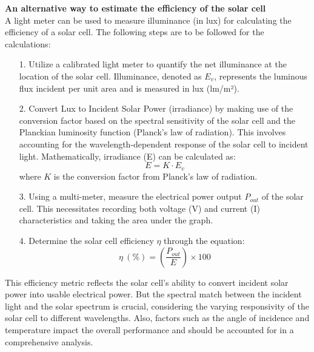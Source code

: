 \textbf{An alternative way to estimate the efficiency of the solar cell}\\ A light meter can be used to measure illuminance (in lux) for calculating the efficiency of a solar cell. The following steps are to be followed for the calculations: 
\begin{itemize} 
\item [1.] Utilize a calibrated light meter to quantify the net illuminance at the location of the solar cell. Illuminance, denoted as $E_v$, represents the luminous flux incident per unit area and is measured in lux (lm/m²).
\item [2.] Convert Lux to Incident Solar Power (irradiance) by making use of the conversion factor based on the spectral sensitivity of the solar cell and the Planckian luminosity function (Planck's law of radiation). This involves accounting for the wavelength-dependent response of the solar cell to incident light. Mathematically, irradiance (E) can be calculated as: 
\[E = K \cdot E_v\] where \(K\) is the conversion factor from Planck's law of radiation. 
\item [3.] Using a multi-meter, measure the electrical power output $P_{out}$ of the solar cell. This necessitates recording both voltage (V) and current (I) characteristics and taking the area under the graph.
\item [4.] Determine the solar cell efficiency $\eta$ through the equation: 
\[\eta \ (\%) = \left (\frac{P_{out}}{E}\right) \times 100\] 
\end{itemize} 
This efficiency metric reflects the solar cell's ability to convert incident solar power into usable electrical power. But the spectral match between the incident light and the solar spectrum is crucial, considering the varying responsivity of the solar cell to different wavelengths. Also, factors such as the angle of incidence and temperature impact the overall performance and should be accounted for in a comprehensive analysis.
